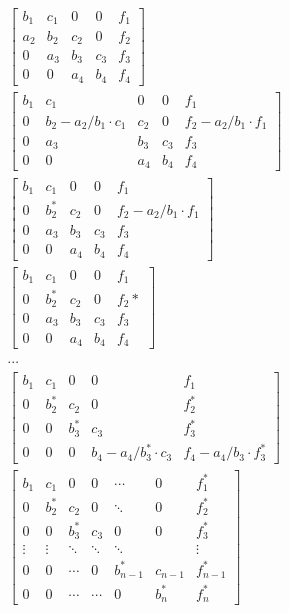 \documentclass[a4paper,10pt,norsk]{article}
\begin{document}
\begin{align*}
\begin{bmatrix}
b_1 & c_1 &  0  &  0  & f_1\\
a_2 & b_2 & c_2 &  0  & f_2\\
 0  & a_3 & b_3 & c_3 & f_3\\
 0  &  0  & a_4 & b_4 & f_4
\end{bmatrix} \\
\begin{bmatrix}
b_1 & c_1 &  0  &  0   & f_1\\
0 & b_2-a_2/b_1 \cdot c_1 & c_2 &  0  & f_2-a_2/b_1\cdot f_1\\
0 & a_3 & b_3 & c_3 & f_3\\
0 &  0  & a_4 & b_4 & f_4
\end{bmatrix}\\
\begin{bmatrix}
b_1 & c_1 &  0  &  0   & f_1\\
0 & b_2^* & c_2 &  0  & f_2-a_2/b_1\cdot f_1\\
0 & a_3 & b_3 & c_3 & f_3\\
0 &  0  & a_4 & b_4 & f_4
\end{bmatrix}\\ 
\begin{bmatrix}
b_1 & c_1   &  0  &  0  & f_1\\
0   & b_2^* & c_2 &  0  & f_2*\\
0   & a_3   & b_3 & c_3 & f_3\\
0   & 0     & a_4 & b_4 & f_4
\end{bmatrix}\\ 
\\
\cdots\\
\begin{bmatrix}
 b_1  & c_1   &  0     &  0         &  f_1  \\
 0  &  b_2^*  &  c_2   &  0         &  f_2^* \\
 0  &  0     &  b_3^*  &  c_3       &  f_3^*  \\
 0  &  0     &  0     &  b_4- a_4/b_3^*\cdot c_3 &  f_4- a_4/b_3\cdot f_3^*
\end{bmatrix}\\
\begin{bmatrix}
 b_1     & c_1    &   0        &   0      & \cdots     &     0      &  f_1^*  \\[-0.2em]
 0      &  b_2^*  &   c_2      &   0      & \ddots     &     0      &  f_2^*  \\[0.5em]
 0      &  0      &   b_3^*   &  c_3     &  0          &     0      &  f_3^*  \\
 \vdots &  \vdots &  \ddots   & \ddots   & \ddots     &            & \vdots  \\ 
 0      &  0      &  \cdots   &    0     &  b_{n-1}^*  &    c_{n-1}  & f_{n-1}^* \\[0.7em]
 0      &  0      &  \cdots   & \cdots   &  0         &     b_n^*  &  f_n^*
\end{bmatrix}\\
\end{align*}
\end{document}
